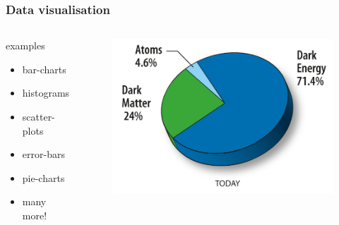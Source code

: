 \documentclass[10pt, compress]{beamer}
\begin{document}
\begin{frame}
    \frametitle{Data visualisation}
    \begin{columns}
        \begin{block}{examples}
            \begin{itemize}
                \item{bar-charts}
                \item{histograms}
                \item{scatter-plots}
                \item{error-bars}
                \item{pie-charts}
                \item{many more!}
            \end{itemize}
        \end{block}
        \begin{block}{}
            \begin{figure}
                \begin{center}
                    \includegraphics[scale=0.2]{img/121236_NewPieCharts720.png}
                \end{center}
            \end{figure}
        \end{block}
    \end{columns}
\end{frame}
\end{document}
